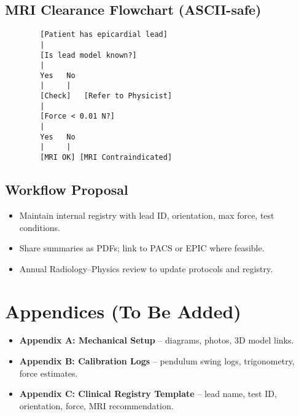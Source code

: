 \documentclass[12pt]{article}
\begin{document}
	\subsection*{MRI Clearance Flowchart (ASCII-safe)}
	\begin{verbatim}
		[Patient has epicardial lead]
		|
		[Is lead model known?]
		|
		Yes   No
		|     |
		[Check]   [Refer to Physicist]
		|
		[Force < 0.01 N?]
		|
		Yes   No
		|     |
		[MRI OK] [MRI Contraindicated]
	\end{verbatim}
	
	\subsection*{Workflow Proposal}
	\begin{itemize}
		\item Maintain internal registry with lead ID, orientation, max force, test conditions.
		\item Share summaries as PDFs; link to PACS or EPIC where feasible.
		\item Annual Radiology--Physics review to update protocols and registry.
	\end{itemize}
	
	\section*{Appendices (To Be Added)}
	\begin{itemize}
		\item \textbf{Appendix A: Mechanical Setup} -- diagrams, photos, 3D model links.
		\item \textbf{Appendix B: Calibration Logs} -- pendulum swing logs, trigonometry, force estimates.
		\item \textbf{Appendix C: Clinical Registry Template} -- lead name, test ID, orientation, force, MRI recommendation.
	\end{itemize}
	
\end{document}
